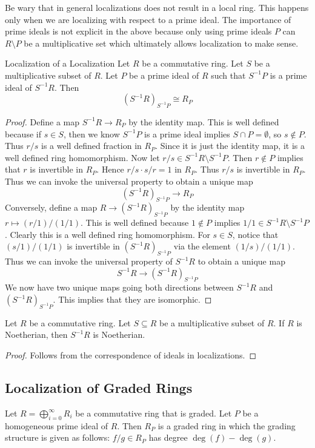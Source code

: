 \documentclass[a4paper]{article}
\begin{document}
Be wary that in general localizations does not result in a local ring. This happens only when we are localizing with respect to a prime ideal. The importance of prime ideals is not explicit in the above because only using prime ideals $P$ can $R\setminus P$ be a multiplicative set which ultimately allows localization to make sense. 

\begin{prp}{Localization of a Localization}{} Let $R$ be a commutative ring. Let $S$ be a multiplicative subset of $R$. Let $P$ be a prime ideal of $R$ such that $S^{-1}P$ is a prime ideal of $S^{-1}R$. Then $$(S^{-1}R)_{S^{-1}P}\cong R_P$$ \tcbline
\begin{proof}
Define a map $S^{-1}R\to R_P$ by the identity map. This is well defined because if $s\in S$, then we know $S^{-1}P$ is a prime ideal implies $S\cap P=\emptyset$, so $s\notin P$. Thus $r/s$ is a well defined fraction in $R_P$. Since it is just the identity map, it is a well defined ring homomorphism. Now let $r/s\in S^{-1}R\setminus S^{-1}P$. Then $r\notin P$ implies that $r$ is invertible in $R_P$. Hence $r/s\cdot s/r=1$ in $R_P$. Thus $r/s$ is invertible in $R_P$. Thus we can invoke the universal property to obtain a unique map $$(S^{-1}R)_{S^{-1}P}\to R_P$$ Conversely, define a map $R\to (S^{-1}R)_{S^{-1}P}$ by the identity map $r\mapsto (r/1)/(1/1)$. This is well defined because $1\notin P$ implies $1/1\in S^{-1}R\setminus S^{-1}P$. Clearly this is a well defined ring homomorphism. For $s\in S$, notice that $(s/1)/(1/1)$ is invertible in $(S^{-1}R)_{S^{-1}P}$ via the element $(1/s)/(1/1)$. Thus we can invoke the universal property of $S^{-1}R$ to obtain a unique map $$S^{-1}R\to(S^{-1}R)_{S^{-1}P}$$ We now have two unique maps going both directions between $S^{-1}R$ and $(S^{-1}R)_{S^{-1}P}$. This implies that they are isomorphic. 
\end{proof}
\end{prp}

\begin{lmm}{}{} Let $R$ be a commutative ring. Let $S\subseteq R$ be a multiplicative subset of $R$. If $R$ is Noetherian, then $S^{-1}R$ is Noetherian. \tcbline
\begin{proof}
Follows from the correspondence of ideals in localizations. 
\end{proof}
\end{lmm}

\subsection{Localization of Graded Rings}
\begin{prp}{}{} Let $R=\bigoplus_{i=0}^\infty R_i$ be a commutative ring that is graded. Let $P$ be a homogeneous prime ideal of $R$. Then $R_P$ is a graded ring in which the grading structure is given as follows: $f/g\in R_P$ has degree $\deg(f)-\deg(g)$. 
\end{prp}
\end{document}
